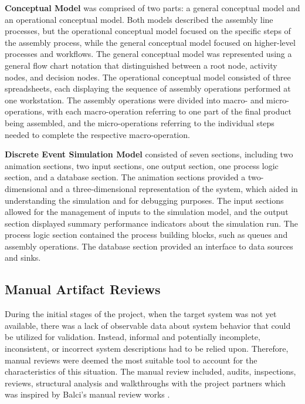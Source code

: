 \documentclass{llncs}
\begin{document}
    \textbf{Conceptual Model} was comprised of two parts:  a general conceptual model and an operational conceptual model. Both models described the assembly line processes, but the operational conceptual model focused on the specific steps of the assembly process, while the general conceptual model focused on higher-level processes and workflows.
    The general conceptual model was represented using a general flow chart notation that distinguished between a root node, activity nodes, and decision nodes.
    The operational conceptual model consisted of three spreadsheets, each displaying the sequence of assembly operations performed at one workstation. 
    The assembly operations were divided into macro- and micro-operations, with each macro-operation referring 
    to one part of the final product being assembled, and the micro-operations referring to the individual steps needed to complete the respective macro-operation.

    \textbf{Discrete Event Simulation Model} consisted of seven sections, including two animation sections, two input sections, one output section, one process logic section, and a database section. The animation sections provided a two-dimensional and a three-dimensional representation of the system, which aided in understanding the simulation and for debugging purposes. The input sections allowed for the management of inputs to the simulation model, and the output section displayed summary performance indicators about the simulation run. 
    The process logic section contained the process building blocks, such as queues and assembly operations. The database section provided an interface to data sources and sinks.
    
    \subsection{Manual Artifact Reviews}
    During the initial stages of the project, when the target system was not yet available,
    there was a lack of observable data about system behavior that could be utilized for validation. 
    Instead, informal and potentially incomplete, inconsistent, or incorrect system descriptions had to be relied upon. 
    Therefore, manual reviews were deemed the most suitable tool to account for the characteristics of this situation.
    The manual review included, audits, inspections, reviews, structural analysis and walkthroughs 
    with the project partners which was inspired by Balci's manual review works \cite{balcitechniques}. 
    
\end{document}
